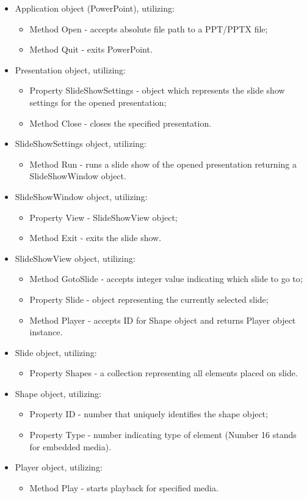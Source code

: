 \documentclass[12pt, fleqn, a4paper]{article}
\begin{document}
\begin{itemize}
	\item Application object (PowerPoint), utilizing:
		\begin{itemize}
			\item Method Open - accepts absolute file path to a PPT/PPTX file;
			\item Method Quit - exits PowerPoint.
		\end{itemize}
	\item Presentation object, utilizing:
		\begin{itemize}
			\item Property SlideShowSettings - object which represents the slide show settings for the opened presentation;
			\item Method Close - closes the specified presentation.
		\end{itemize}
	\item SlideShowSettings object, utilizing:
		\begin{itemize}
			\item Method Run - runs a slide show of the opened presentation returning a SlideShowWindow object.
		\end{itemize}
	\item SlideShowWindow object, utilizing:
		\begin{itemize}
			\item Property View - SlideShowView object;
			\item Method Exit - exits the slide show.
		\end{itemize}
	\item SlideShowView object, utilizing:
		\begin{itemize}
			\item Method GotoSlide - accepts integer value indicating which slide to go to;
			\item Property Slide - object representing the currently selected slide;
			\item Method Player - accepts ID for Shape object and returns Player object instance.
		\end{itemize}
	\item Slide object, utilizing:
		\begin{itemize}
			\item Property Shapes - a collection representing all elements placed on slide.
		\end{itemize}
	\item Shape object, utilizing:
		\begin{itemize}
			\item Property ID - number that uniquely identifies the shape object;
			\item Property Type - number indicating type of element (Number 16 stands for embedded media).
		\end{itemize}
	\item Player object, utilizing:
		\begin{itemize}
			\item Method Play - starts playback for specified media.
		\end{itemize}
\end{itemize}
\end{document}
